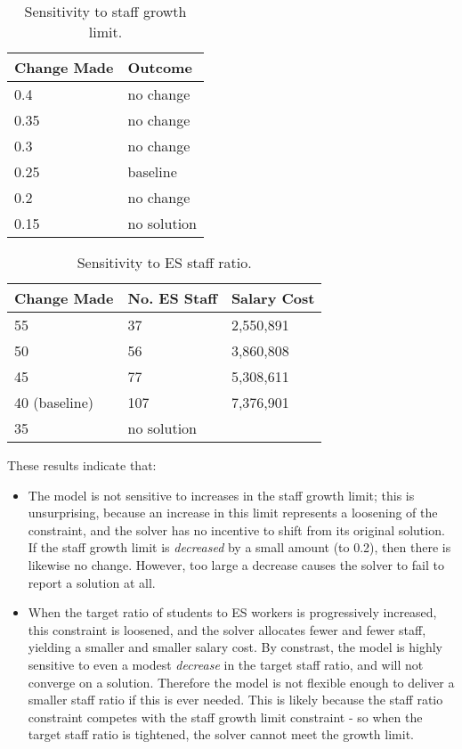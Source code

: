 \documentclass[11pt, a4paper]{article}
\begin{document}
    \begin{table}[!ht]
        \centering
        \caption{Sensitivity to staff growth limit.}
        \begin{tabular}{|l|l|}
        \hline
            Change Made & Outcome \\ \hline
            0.4 & no change \\ \hline
            0.35 & no change \\ \hline
            0.3 & no change \\ \hline
            0.25 & baseline \\ \hline
            0.2 & no change \\ \hline
            0.15 & no solution \\ \hline
        \end{tabular}
        \label{sens1}
    \end{table}

    \begin{table}[!ht]
        \centering
        \caption{Sensitivity to ES staff ratio.}
        \begin{tabular}{|l|l|l|}
        \hline
            Change Made & No. ES Staff & Salary Cost \\ \hline
            55 & 37 & 2,550,891 \\ \hline
            50 & 56 & 3,860,808 \\ \hline
            45 & 77 & 5,308,611 \\ \hline 
            40 (baseline) & 107 & 7,376,901 \\ \hline
            35 & no solution & ~ \\ \hline
        \end{tabular}
        \label{sens2}
    \end{table}

    These results indicate that:

    \begin{itemize}
        \item The model is not sensitive to increases in the staff growth limit; this is unsurprising, because an increase in this limit represents a loosening of the constraint, and the solver has no incentive to shift from its original solution. If the staff growth limit is \textit{decreased} by a small amount (to 0.2), then there is likewise no change. However, too large a decrease causes the solver to fail to report a solution at all.
        \item When the target ratio of students to ES workers is progressively increased, this constraint is loosened, and the solver allocates fewer and fewer staff, yielding a smaller and smaller salary cost. By constrast, the model is highly sensitive to even a modest \textit{decrease} in the target staff ratio, and will not converge on a solution. Therefore the model is not flexible enough to deliver a smaller staff ratio if this is ever needed. This is likely because the staff ratio constraint competes with the staff growth limit constraint - so when the target staff ratio is tightened, the solver cannot meet the growth limit.
    \end{itemize}
    
\end{document}

